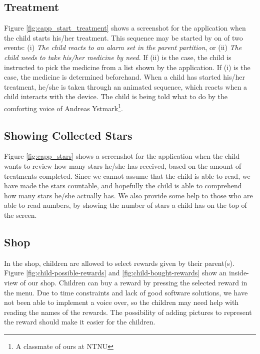 \subsection{Treatment}
\label{sec:sec:description-treatment}
Figure \ref{fig:capp_start_treatment} shows a screenshot for the application when the child starts his/her treatment. This sequence may be started by on of two events: (i) \emph{The child reacts to an alarm set in the parent partition}, or (ii) \emph{The child needs to take his/her medicine by need}. If (ii) is the case, the child is instructed to pick the medicine from a list shown by the application. If (i) is the case, the medicine is determined beforehand. When a child has started his/her treatment, he/she is taken through an animated sequence, which reacts when a child interacts with the device. The child is being told what to do by the comforting voice of Andreas Ystmark\footnote{A classmate of ours at NTNU}.  


\subsection{Showing Collected Stars}
\label{sec:description-show-rewards}
Figure \ref{fig:capp_stars} shows a screenshot for the application when the child wants to review how many stars he/she has received, based on the amount of treatments completed. Since we cannot assume that the child is able to read, we have made the stars countable, and hopefully the child is able to comprehend how many stars he/she actually has. We also provide some help to those who are able to read numbers, by showing the number of stars a child has on the top of the screen.      

\subsection{Shop}
\label{sec:description-shop}
In the shop, children are allowed to select rewards given by their parent(s). Figure \ref{fig:child-possible-rewards} and \ref{fig:child-bought-rewards} show an inside-view of our shop. Children can buy a reward by pressing the selected reward in the menu. Due to time constraints and lack of good software solutions, we have not been able to implement a voice over, so the children may need help with reading the names of the rewards. The possibility of adding pictures to represent the reward should make it easier for the children. 


